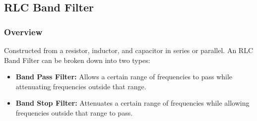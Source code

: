 \subsection{RLC Band Filter}\label{sec:filt_rlc_band}

\subsubsection{Overview}
Constructed from a resistor, inductor, and capacitor in series
or parallel. An RLC Band Filter can be broken down into two types:
\begin{itemize}
  \item \textbf{Band Pass Filter:} Allows a certain range of
    frequencies to pass while attenuating frequencies outside
    that range.
  \item \textbf{Band Stop Filter:} Attenuates a certain range of
    frequencies while allowing frequencies outside that range
    to pass.
\end{itemize}

